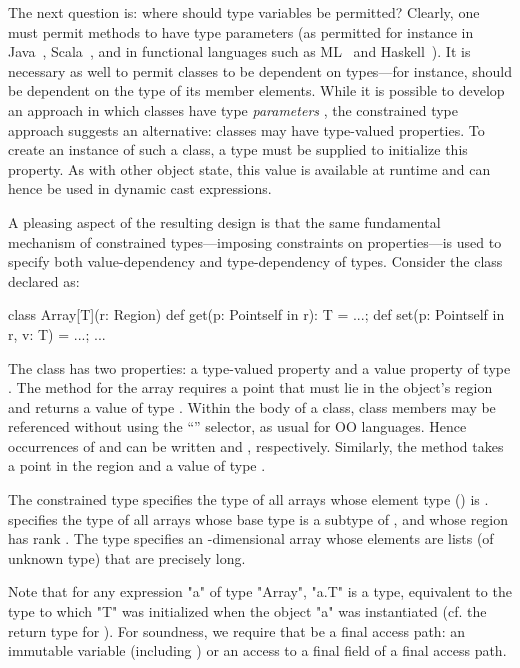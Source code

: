 The next question is: where should type variables be permitted?
Clearly, one must permit methods to have type parameters (as permitted
for instance in Java~\cite{Java3}, Scala~\cite{scala}, and in
functional languages such as ML~\cite{ml} and Haskell~\cite{haskell}).
It is necessary as well to permit classes to be dependent on types---for
instance,  should be dependent on the type of its
member elements. While it is possible to develop an approach in which
classes have type \emph{parameters} \cite{Java3}, the constrained
type approach suggests an alternative: classes may have type-valued
properties. To create an instance of such
a class, a type must be supplied to initialize this property. As with
other object state, this value is available at runtime and
can hence be used in dynamic cast expressions.

A pleasing aspect of the resulting design is that the same fundamental
mechanism of constrained types---imposing constraints on properties---is
used to specify both value-dependency and type-dependency of types.
Consider the class  declared as:
{
\begin{xten}
class Array[T](r: Region) {
  def get(p: Point{self in r}): T = ...;
  def set(p: Point{self in r}, v: T) = ...;
  ...
}
\end{xten}}
\noindent The class has two properties: a type-valued property
 and a value property  of type .
The  method for the array requires a
point  that must lie in the object's region and returns a
value of type . Within the body of
a class, class members may be referenced without using the
``'' selector, as usual for OO languages. Hence occurrences of
 and  can be written  and
, respectively.
Similarly, the  method takes a point in the region and
a value of type .

The constrained type  specifies the type of all
arrays
whose element type () is .
 
specifies the type of all arrays whose base
type is a subtype of , and whose region has rank
.
The type 
 
specifies an -dimensional array whose elements are lists (of
unknown type) that are precisely  long.

Note that for any expression \xcd"a" of type \xcd"Array", \xcd"a.T" is
a type, equivalent to the type to which \xcd"T" was initialized when
the object \xcd"a" was instantiated
(cf. the return type  for ).
For soundness, we require
that  be a final access path: an immutable
variable (including ) or an access to a final field of a final access
path.

